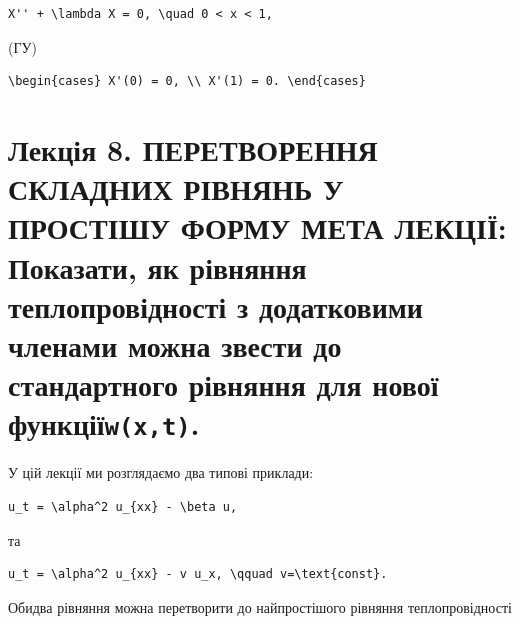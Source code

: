 \documentclass[
  ukrainian,
]{article}
\begin{document}
\begin{verbatim}
X'' + \lambda X = 0, \quad 0 < x < 1,
\end{verbatim}

(ГУ)

\begin{verbatim}
\begin{cases} X'(0) = 0, \\ X'(1) = 0. \end{cases}
\end{verbatim}

\section{\texorpdfstring{Лекція 8. ПЕРЕТВОРЕННЯ СКЛАДНИХ РІВНЯНЬ У
ПРОСТІШУ ФОРМУ МЕТА ЛЕКЦІЇ: Показати, як рівняння теплопровідності з
додатковими членами можна звести до стандартного рівняння для нової
функції\texttt{w(x,t)}.}{Лекція 8. ПЕРЕТВОРЕННЯ СКЛАДНИХ РІВНЯНЬ У ПРОСТІШУ ФОРМУ МЕТА ЛЕКЦІЇ: Показати, як рівняння теплопровідності з додатковими членами можна звести до стандартного рівняння для нової функціїw(x,t).}}\label{ux43bux435ux43aux446ux456ux44f-8.-ux43fux435ux440ux435ux442ux432ux43eux440ux435ux43dux43dux44f-ux441ux43aux43bux430ux434ux43dux438ux445-ux440ux456ux432ux43dux44fux43dux44c-ux443-ux43fux440ux43eux441ux442ux456ux448ux443-ux444ux43eux440ux43cux443-ux43cux435ux442ux430-ux43bux435ux43aux446ux456ux457-ux43fux43eux43aux430ux437ux430ux442ux438-ux44fux43a-ux440ux456ux432ux43dux44fux43dux43dux44f-ux442ux435ux43fux43bux43eux43fux440ux43eux432ux456ux434ux43dux43eux441ux442ux456-ux437-ux434ux43eux434ux430ux442ux43aux43eux432ux438ux43cux438-ux447ux43bux435ux43dux430ux43cux438-ux43cux43eux436ux43dux430-ux437ux432ux435ux441ux442ux438-ux434ux43e-ux441ux442ux430ux43dux434ux430ux440ux442ux43dux43eux433ux43e-ux440ux456ux432ux43dux44fux43dux43dux44f-ux434ux43bux44f-ux43dux43eux432ux43eux457-ux444ux443ux43dux43aux446ux456ux457wxt.}

У цій лекції ми розглядаємо два типові приклади:

\begin{verbatim}
u_t = \alpha^2 u_{xx} - \beta u,
\end{verbatim}

та

\begin{verbatim}
u_t = \alpha^2 u_{xx} - v u_x, \qquad v=\text{const}.
\end{verbatim}

Обидва рівняння можна перетворити до найпростішого рівняння
теплопровідності
\end{document}
